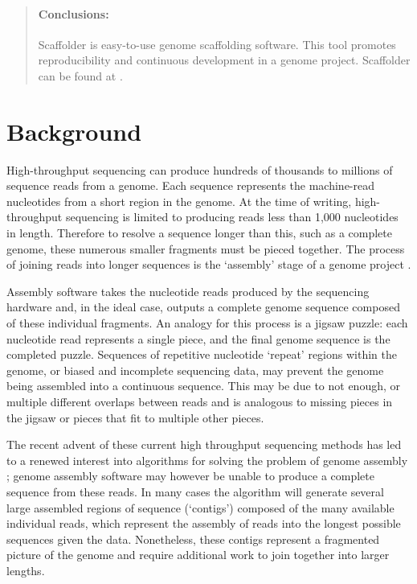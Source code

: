 \documentclass[10pt]{bmc_article}
\newenvironment{bmcformat}{\begin{raggedright}\baselineskip20pt\sloppy\setboolean{publ}{false}}{\end{raggedright}\baselineskip20pt\sloppy}
\begin{document}
\begin{bmcformat}
\begin{abstract}
  \paragraph*{Conclusions:} Scaffolder is easy-to-use genome scaffolding
  software. This tool promotes reproducibility and continuous development in a
  genome project. Scaffolder can be found at \scaffolder.

\end{abstract}


\clearpage

\section*{Background} %

High-throughput sequencing can produce hundreds of thousands to millions of
sequence reads from a genome. Each sequence represents the machine-read
nucleotides from a short region in the genome. At the time of writing,
high-throughput sequencing is limited to producing reads less than 1,000
nucleotides in length. Therefore to resolve a sequence longer than this, such
as a complete genome, these numerous smaller fragments must be pieced together.
The process of joining reads into longer sequences is the `assembly' stage of
a genome project \cite{miller2010}. \pb

Assembly software takes the nucleotide reads produced by the sequencing
hardware and, in the ideal case, outputs a complete genome sequence composed of
these individual fragments. An analogy for this process is a jigsaw puzzle:
each nucleotide read represents a single piece, and the final genome sequence
is the completed puzzle. Sequences of repetitive nucleotide `repeat' regions
within the genome, or biased and incomplete sequencing data, may prevent the
genome being assembled into a continuous sequence. This may be due to not
enough, or multiple different overlaps between reads and is analogous to
missing pieces in the jigsaw or pieces that fit to multiple other pieces. \pb

The recent advent of these current high throughput sequencing methods has led
to a renewed interest into algorithms for solving the problem of genome
assembly \cite{pop2008,pop2009}; genome assembly software may however be unable
to produce a complete sequence from these reads. In many cases the algorithm
will generate several large assembled regions of sequence (`contigs') composed
of the many available individual reads, which represent the assembly of reads
into the longest possible sequences given the data. Nonetheless, these contigs
represent a fragmented picture of the genome and require additional work to
join together into larger lengths. \pb


\end{bmcformat}
\end{document}
